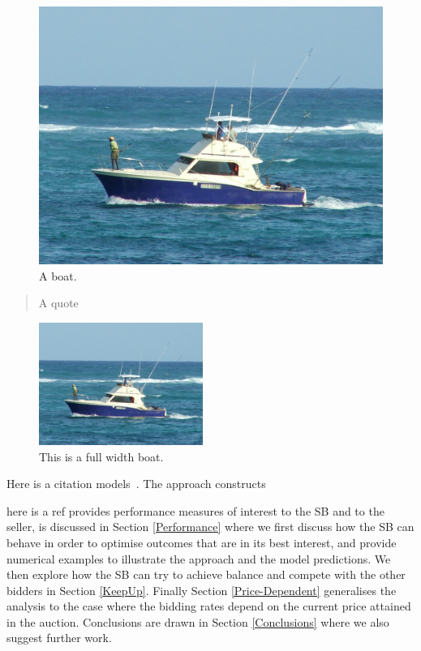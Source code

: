 \documentclass{comjnl}
\begin{document}
\begin{figure}
  \includegraphics[width=\linewidth]{boat.jpg}
  \caption{A boat.}
  \label{fig:boat1}
\end{figure}

\begin{quotation}
A quote
\end{quotation}

\begin{figure}
  \includegraphics[width=\textwidth,height=4cm]{boat.jpg}
  \caption{This is a full width boat.}
  \label{fig:boat1}
\end{figure}


Here is a citation models~\cite{gelenbe06}. The approach constructs

here is a ref provides performance measures of interest to the SB and to the
seller, is discussed in Section \ref{Performance} where we first
discuss how the SB can behave in order to optimise outcomes that
are in its best interest, and provide  numerical examples to
illustrate the approach and the model predictions. We then explore
how the SB can try to achieve balance and compete with the other
bidders in Section \ref{KeepUp}. Finally Section
\ref{Price-Dependent} generalises the analysis to the case where
the bidding rates depend on the current price attained in the
auction. Conclusions are drawn in Section \ref{Conclusions} where
we also suggest further work.
\end{document}
